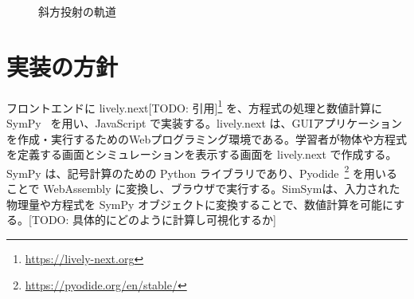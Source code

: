\documentclass[11pt, a4paper, oneside, twocolumn, dvipdfmx]{jsarticle}
\newcommand{\simname}{SimSym}
\begin{document}
\begin{figure}[htb]
\centering
\begin{minipage}{0.8\linewidth}
\centering
{}
\caption{斜方投射の軌道} \label{correct}
\end{minipage}
\end{figure}

\section{実装の方針} \label{sec3}
フロントエンドに lively.next[TODO: 引用]\footnote{\url{https://lively-next.org}} を、方程式の処理と数値計算に SymPy~\cite{meurer_sympy_2017} を用い、JavaScript で実装する。lively.next は、GUIアプリケーションを作成・実行するためのWebプログラミング環境である。学習者が物体や方程式を定義する画面とシミュレーションを表示する画面を lively.next で作成する。SymPy は、記号計算のための Python ライブラリであり、Pyodide~\footnote{\url{https://pyodide.org/en/stable/}} を用いることで WebAssembly に変換し、ブラウザで実行する。\simname は、入力された物理量や方程式を SymPy オブジェクトに変換することで、数値計算を可能にする。[TODO: 具体的にどのように計算し可視化するか]

\end{document}
